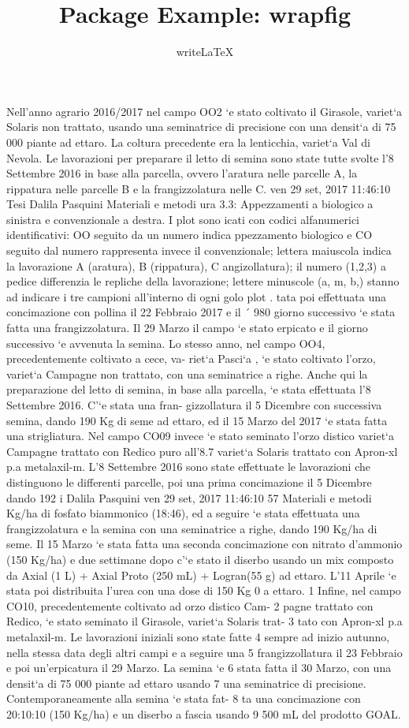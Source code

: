 \documentclass[a4paper]{article}
\title{Package Example: wrapfig}
\author{writeLaTeX}
\begin{document}
Nell’anno agrario
 2016/2017 nel campo OO2 `e stato coltivato il Girasole, variet`a
 Solaris non trattato, usando una seminatrice di precisione con una
 densit`a di 75 000 piante ad ettaro. La coltura precedente era la
 lenticchia, variet`a Val di Nevola. Le lavorazioni per preparare il
 letto di semina sono state tutte svolte l’8 Settembre 2016 in base
 alla parcella, ovvero l’aratura nelle parcelle A, la rippatura nelle
 parcelle B e la frangizzolatura nelle C.  ven 29 set, 2017 11:46:10
 Tesi Dalila Pasquini Materiali e metodi ura 3.3: Appezzamenti a
 biologico a sinistra e convenzionale a destra. I plot sono icati con
 codici alfanumerici identificativi: OO seguito da un numero indica
 ppezzamento biologico e CO seguito dal numero rappresenta invece il
 convenzionale; lettera maiuscola indica la lavorazione A (aratura), B
 (rippatura), C angizollatura); il numero (1,2,3) a pedice differenzia
 le repliche della lavorazione; lettere minuscole (a, m, b,) stanno ad
 indicare i tre campioni all’interno di ogni golo plot .  tata poi
 effettuata una concimazione con pollina il 22 Febbraio 2017 e il ´
 980 giorno successivo `e stata fatta una frangizzolatura. Il 29 Marzo
 il campo `e stato erpicato e il giorno successivo `e avvenuta la
 semina.  Lo stesso anno, nel campo OO4, precedentemente coltivato a
 cece, va- riet`a Pasci`a , `e stato coltivato l’orzo, variet`a
 Campagne non trattato, con una seminatrice a righe. Anche qui la
 preparazione del letto di semina, in base alla parcella, `e stata
 effettuata l’8 Settembre 2016. C’`e stata una fran- gizzollatura il 5
 Dicembre con successiva semina, dando 190 Kg di seme ad ettaro, ed il
 15 Marzo del 2017 `e stata fatta una strigliatura.  Nel campo CO09
 invece `e stato seminato l’orzo distico variet`a Campagne trattato
 con Redico puro all’8.7%
 variet`a Solaris trattato con Apron-xl p.a metalaxil-m.  L’8
 Settembre 2016 sono state effettuate le lavorazioni che distinguono
 le differenti parcelle, poi una prima concimazione il 5 Dicembre
 dando 192 i Dalila Pasquini ven 29 set, 2017 11:46:10 57 Materiali e
 metodi Kg/ha di fosfato biammonico (18:46), ed a seguire `e stata
 effettuata una frangizzolatura e la semina con una seminatrice a
 righe, dando 190 Kg/ha di seme. Il 15 Marzo `e stata fatta una
 seconda concimazione con nitrato d’ammonio (150 Kg/ha) e due
 settimane dopo c’`e stato il diserbo usando un mix composto da Axial
 (1 L) + Axial Proto (250 mL) + Logran(55 g) ad ettaro. L’11 Aprile `e
 stata poi distribuita l’urea con una dose di 150 Kg 0 a ettaro.  1
 Infine, nel campo CO10, precedentemente coltivato ad orzo distico
 Cam- 2 pagne trattato con Redico, `e stato seminato il Girasole,
 variet`a Solaris trat- 3 tato con Apron-xl p.a metalaxil-m. Le
 lavorazioni iniziali sono state fatte 4 sempre ad inizio autunno,
 nella stessa data degli altri campi e a seguire una 5
 frangizzollatura il 23 Febbraio e poi un’erpicatura il 29 Marzo. La
 semina `e 6 stata fatta il 30 Marzo, con una densit`a di 75 000
 piante ad ettaro usando 7 una seminatrice di
 precisione. Contemporaneamente alla semina `e stata fat- 8 ta una
 concimazione con 20:10:10 (150 Kg/ha) e un diserbo a fascia usando 9
 500 mL del prodotto GOAL.
\end{document}
